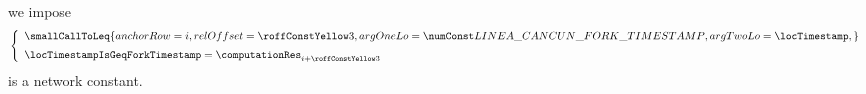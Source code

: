 \item[\underline{\underline{Comparing the timestamp to the \lineaCancunForkTimestamp{}:}}]
	we impose
	\[
		\left\{ \begin{array}{l}
			\smallCallToLeq {
				anchorRow = i                                       ,
				relOffset = \FSEEtimestampToForkTimestampComparison ,
				argOneLo  = \lineaCancunForkTimestamp               ,
				argTwoLo  = \locTimestamp                           ,
			}
			\vspace{2mm} \\
			\locTimestampIsGeqForkTimestamp = \computationRes _{i + \FSEEtimestampToForkTimestampComparison} \\
		\end{array} \right.
	\]
	\saNote{}
	\lineaCancunForkTimestamp{}
	is a network constant.

